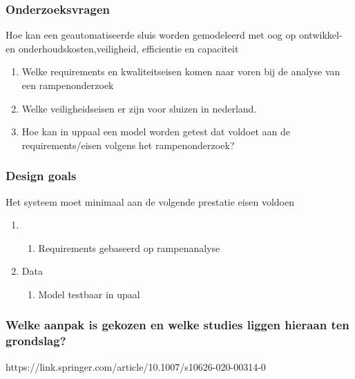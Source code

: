 \subsubsection{Onderzoeksvragen }

Hoe kan een geautomatiseerde sluis worden gemodeleerd met oog op ontwikkel- en onderhoudskosten,veiligheid, efficientie en capaciteit





\begin{enumerate}

	\item Welke requirements en kwaliteitseisen komen naar voren bij de analyse van een rampenonderzoek
	\item Welke veiligheidseisen er zijn voor sluizen in nederland. 
	\item Hoe kan in uppaal  een model worden getest dat voldoet aan de requirements/eisen volgens het rampenonderzoek?
\end{enumerate}



\subsubsection{Design goals}
Het systeem moet minimaal aan de volgende prestatie eisen voldoen 

\begin{enumerate}
	\item  
	\begin{enumerate}
		\item Requirements gebaseerd op rampenanalyse
	\end{enumerate}
	\item Data
	\begin{enumerate}
		\item Model testbaar in upaal
	\end{enumerate}
	
\end{enumerate}

\subsubsection{Welke aanpak is gekozen en welke studies liggen hieraan ten grondslag?}
https://link.springer.com/article/10.1007/s10626-020-00314-0


